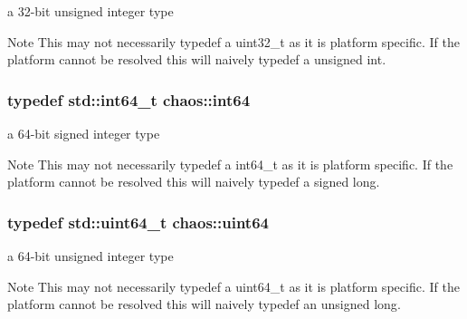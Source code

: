 a 32-\/bit unsigned integer type 

\begin{DoxyNote}{Note}
This may not necessarily {\ttfamily typedef} a {\ttfamily uint32\-\_\-t} as it is platform specific. If the platform cannot be resolved this will naively {\ttfamily typedef} a {\ttfamily unsigned int}. 
\end{DoxyNote}
\hypertarget{namespacechaos_aa4cfe70894188e01134a2694db2eb2db}{
\subsubsection[{int64}]{\setlength{\rightskip}{0pt plus 5cm}typedef std\-::int64\-\_\-t {\bf chaos\-::int64}}}\label{namespacechaos_aa4cfe70894188e01134a2694db2eb2db}


a 64-\/bit signed integer type 

\begin{DoxyNote}{Note}
This may not necessarily {\ttfamily typedef} a {\ttfamily int64\-\_\-t} as it is platform specific. If the platform cannot be resolved this will naively {\ttfamily typedef} a {\ttfamily signed long}. 
\end{DoxyNote}
\hypertarget{namespacechaos_a9d62ad11fed4e3a5af70653b228ac910}{
\subsubsection[{uint64}]{\setlength{\rightskip}{0pt plus 5cm}typedef std\-::uint64\-\_\-t {\bf chaos\-::uint64}}}\label{namespacechaos_a9d62ad11fed4e3a5af70653b228ac910}


a 64-\/bit unsigned integer type 

\begin{DoxyNote}{Note}
This may not necessarily {\ttfamily typedef} a {\ttfamily uint64\-\_\-t} as it is platform specific. If the platform cannot be resolved this will naively {\ttfamily typedef} an {\ttfamily unsigned long}. 
\end{DoxyNote}
